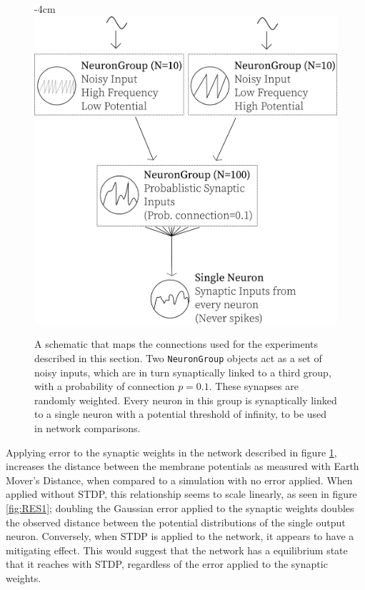\begin{figure}[h!]
    \centering
    \addtolength{\leftskip} {-4cm}
    \addtolength{\rightskip}{-4cm}
    \includegraphics[width=0.8\linewidth]{figures/tops/ExperimentLayout.png}
    \caption[Schematic of the network topology]{A schematic that maps the connections used for the experiments described in this section. Two \texttt{NeuronGroup} objects act as a set of noisy inputs, which are in turn synaptically linked to a third group, with a probability of connection $p=0.1$. These synapses are randomly weighted. Every neuron in this group is synaptically linked to a single neuron with a potential threshold of infinity, to be used in network comparisons.}
    \label{fig:RES1TOP}
\end{figure}
\FloatBarrier

Applying error to the synaptic weights in the network described in figure
\ref{fig:RES1TOP}, increases the distance between the membrane potentials as
measured with Earth Mover's Distance, when compared to a simulation with no
error applied. When applied without STDP, this relationship seems to scale
linearly, as seen in figure \ref{fig:RES1}; doubling the Gaussian error applied
to the synaptic weights doubles the observed distance between the potential
distributions of the single output neuron. Conversely, when STDP is applied to
the network, it appears to have a mitigating effect. This would suggest that the
network has a equilibrium state that it reaches with STDP, regardless of the
error applied to the synaptic weights.

